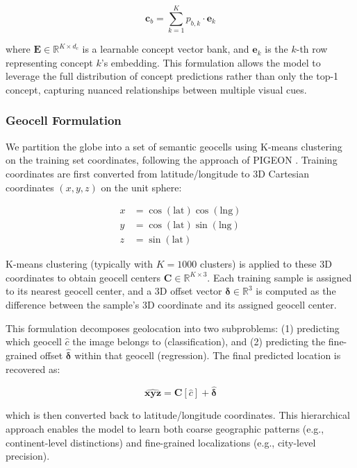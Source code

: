 \documentclass{article}
\begin{document}
\begin{equation}
\mathbf{c}_b = \sum_{k=1}^{K} p_{b,k} \cdot \mathbf{e}_k
\end{equation}

where $\mathbf{E} \in \mathbb{R}^{K \times d_c}$ is a learnable concept vector bank, and $\mathbf{e}_k$ is the $k$-th row representing concept $k$'s embedding. This formulation allows the model to leverage the full distribution of concept predictions rather than only the top-1 concept, capturing nuanced relationships between multiple visual cues.

\subsubsection{Geocell Formulation}

We partition the globe into a set of semantic geocells using K-means clustering on the training set coordinates, following the approach of PIGEON \cite{haas2024pigeonpredictingimagegeolocations}. Training coordinates are first converted from latitude/longitude to 3D Cartesian coordinates $(x, y, z)$ on the unit sphere:

\begin{align}
x &= \cos(\text{lat}) \cos(\text{lng}) \\
y &= \cos(\text{lat}) \sin(\text{lng}) \\
z &= \sin(\text{lat})
\end{align}

K-means clustering (typically with $K=1000$ clusters) is applied to these 3D coordinates to obtain geocell centers $\mathbf{C} \in \mathbb{R}^{K \times 3}$. Each training sample is assigned to its nearest geocell center, and a 3D offset vector $\boldsymbol{\delta} \in \mathbb{R}^3$ is computed as the difference between the sample's 3D coordinate and its assigned geocell center.

This formulation decomposes geolocation into two subproblems: (1) predicting which geocell $\hat{c}$ the image belongs to (classification), and (2) predicting the fine-grained offset $\hat{\boldsymbol{\delta}}$ within that geocell (regression). The final predicted location is recovered as:

\begin{equation}
\hat{\mathbf{xyz}} = \mathbf{C}[\hat{c}] + \hat{\boldsymbol{\delta}}
\end{equation}

which is then converted back to latitude/longitude coordinates. This hierarchical approach enables the model to learn both coarse geographic patterns (e.g., continent-level distinctions) and fine-grained localizations (e.g., city-level precision).
\end{document}

